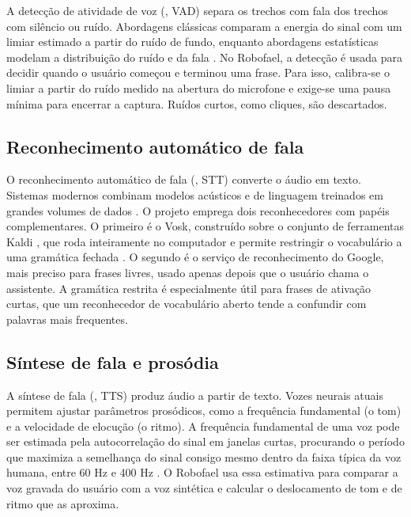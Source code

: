 A detecção de atividade de voz (, VAD) separa os trechos com fala dos
trechos com silêncio ou ruído. Abordagens clássicas comparam a energia do sinal com um limiar estimado a
partir do ruído de fundo, enquanto abordagens estatísticas modelam a distribuição do ruído e da fala
\cite{sohn1999}. No Robofael, a detecção é usada para decidir quando o usuário começou e terminou uma
frase. Para isso, calibra-se o limiar a partir do ruído medido na abertura do microfone e exige-se uma
pausa mínima para encerrar a captura. Ruídos curtos, como cliques, são descartados.

\subsection{Reconhecimento automático de fala}

O reconhecimento automático de fala (, STT) converte o áudio em texto. Sistemas
modernos combinam modelos acústicos e de linguagem treinados em grandes volumes de dados
\cite{jurafsky2009}. O projeto emprega dois reconhecedores com papéis complementares. O primeiro é o
Vosk, construído sobre o conjunto de ferramentas Kaldi \cite{povey2011}, que roda inteiramente no
computador e permite restringir o vocabulário a uma gramática fechada \cite{alphacephei}. O segundo é
o serviço de reconhecimento do Google, mais preciso para frases livres, usado apenas depois que o
usuário chama o assistente. A gramática restrita é especialmente útil para frases de ativação curtas,
que um reconhecedor de vocabulário aberto tende a confundir com palavras mais frequentes.

\subsection{Síntese de fala e prosódia}

A síntese de fala (, TTS) produz áudio a partir de texto. Vozes neurais atuais
permitem ajustar parâmetros prosódicos, como a frequência fundamental (o tom) e a velocidade de
elocução (o ritmo). A frequência fundamental de uma voz pode ser estimada pela autocorrelação do sinal
em janelas curtas, procurando o período que maximiza a semelhança do sinal consigo mesmo dentro da
faixa típica da voz humana, entre 60 Hz e 400 Hz \cite{jurafsky2009}. O Robofael usa essa estimativa
para comparar a voz gravada do usuário com a voz sintética e calcular o deslocamento de tom e de ritmo
que as aproxima.


